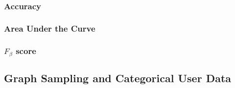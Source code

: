 \subsubsection{Accuracy}

\subsubsection{Area Under the Curve}

\subsubsection{$F_\beta$ score}

\subsection{Graph Sampling and Categorical User Data}
